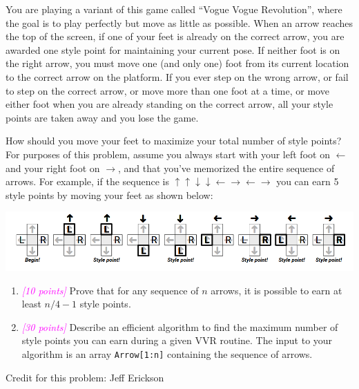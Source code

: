 \documentclass{article}
\newcommand{\points}[1]{\small\textcolor{magenta}{\emph{[#1 points]}} \normalsize}
\begin{document}
You are playing a variant of this game called ``Vogue Vogue Revolution'', where the goal is to play perfectly but move as little as possible.
When an arrow reaches the top of the screen, if one of your feet is already on the correct arrow, you are awarded one style point for maintaining your current pose.
If neither foot is on the right arrow, you must move one (and only one) foot from its current location to the correct arrow on the platform.
If you ever step on the wrong arrow, or fail to step on the correct arrow, or move more than one foot at a time, or move either foot when you are already standing on the correct arrow, all your style points are taken away and you lose the game.

How should you move your feet to maximize your total number of style
points?
For purposes of this problem, assume you always start with your left foot on $\leftarrow$ and your right foot on $\rightarrow$, and that you’ve memorized the entire sequence of arrows.
For example, if the sequence is
$\uparrow \uparrow \downarrow \downarrow \leftarrow \rightarrow \leftarrow \rightarrow$
you can earn 5 style points by moving your feet as shown below:
\begin{center}
  \includegraphics[width=.8\linewidth]{vogue.png}  
\end{center}


\begin{enumerate}
\item \points{10} Prove that for any sequence of $n$ arrows, it is possible to earn at least $n/4 -1$ style points.
\item \points{30} Describe an efficient algorithm to find the maximum number of style points you can earn during a given VVR routine.
  The input to your algorithm is an array {\tt Arrow[1:n]}
  containing the sequence of arrows.
\end{enumerate}

Credit for this problem: Jeff Erickson
\end{document}
